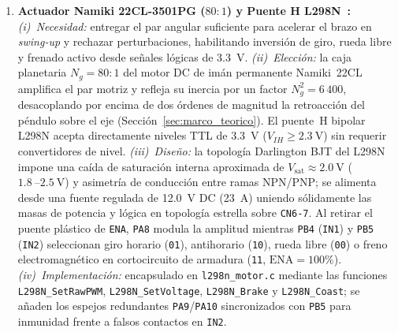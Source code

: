 \begin{enumerate}
    \item \textbf{Actuador Namiki 22CL-3501PG ($80:1$) y Puente H L298N~\cite{L298N_Datasheet}:}
    \textit{(i)~Necesidad:} entregar el par angular suficiente para acelerar el brazo en \textit{swing-up} y rechazar perturbaciones, habilitando inversión de giro, rueda libre y frenado activo desde señales lógicas de \qty{3.3}{\volt}.
    \textit{(ii)~Elección:} la caja planetaria $N_g=80:1$ del motor DC de imán permanente Namiki~22CL amplifica el par motriz y refleja su inercia por un factor $N_g^2=6\,400$, desacoplando por encima de dos órdenes de magnitud la retroacción del péndulo sobre el eje (Sección~\ref{sec:marco_teorico}). El puente~H bipolar L298N acepta directamente niveles TTL de \qty{3.3}{\volt} ($V_{IH}\ge\qty{2.3}{\volt}$) sin requerir convertidores de nivel.
    \textit{(iii)~Diseño:} la topología Darlington BJT del L298N impone una caída de saturación interna aproximada de $V_{\text{sat}}\approx\qty{2.0}{\volt}$ ($\qty{1.8}{}\text{--}\qty{2.5}{\volt}$) y asimetría de conducción entre ramas NPN/PNP; se alimenta desde una fuente regulada de \qty{12.0}{\volt} DC (\qty{2}{}\text{--}\qty{3}{\ampere}) uniendo sólidamente las masas de potencia y lógica en topología estrella sobre \texttt{CN6-7}. Al retirar el puente plástico de \texttt{ENA}, \texttt{PA8} modula la amplitud mientras \texttt{PB4} (\texttt{IN1}) y \texttt{PB5} (\texttt{IN2}) seleccionan giro horario (\texttt{01}), antihorario (\texttt{10}), rueda libre (\texttt{00}) o freno electromagnético en cortocircuito de armadura (\texttt{11}, $\text{ENA}=100\%$).
    \textit{(iv)~Implementación:} encapsulado en \texttt{l298n\_motor.c} mediante las funciones \texttt{L298N\_SetRawPWM}, \texttt{L298N\_SetVoltage}, \texttt{L298N\_Brake} y \texttt{L298N\_Coast}; se añaden los espejos redundantes \texttt{PA9}/\texttt{PA10} sincronizados con \texttt{PB5} para inmunidad frente a falsos contactos en \texttt{IN2}.


\end{enumerate}
